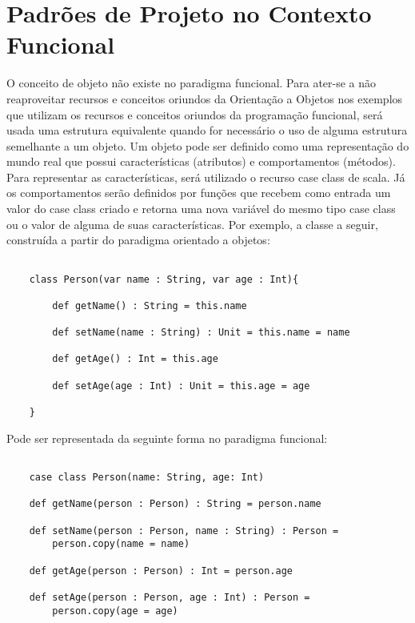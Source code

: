 
\chapter{Padrões de Projeto no Contexto Funcional}

O conceito de objeto não existe no paradigma funcional. Para ater-se a não reaproveitar recursos e conceitos oriundos da Orientação a Objetos nos exemplos que utilizam os recursos e conceitos oriundos da programação funcional, será usada uma estrutura equivalente quando for necessário o uso de alguma estrutura semelhante a um objeto.
Um objeto pode ser definido como uma representação do mundo real que possui características (atributos) e comportamentos (métodos). Para representar as características, será utilizado o recurso case class de scala. Já os comportamentos serão definidos por funções que recebem como entrada um valor do case class criado e retorna uma nova variável do mesmo tipo case class ou o valor de alguma de suas características. Por exemplo, a classe a seguir, construída a partir do paradigma orientado a objetos:



\begin{lstlisting}[caption={Classe comum em Orientação a Objetos},label=ooclass]
    
    class Person(var name : String, var age : Int){

        def getName() : String = this.name

        def setName(name : String) : Unit = this.name = name

        def getAge() : Int = this.age

        def setAge(age : Int) : Unit = this.age = age

    }   

\end{lstlisting}



Pode ser representada da seguinte forma no paradigma funcional:

\begin{lstlisting}[caption={Representação de uma classe no contexto funcional},label=pfclass]
    
    case class Person(name: String, age: Int)

    def getName(person : Person) : String = person.name

    def setName(person : Person, name : String) : Person = 
        person.copy(name = name)

    def getAge(person : Person) : Int = person.age

    def setAge(person : Person, age : Int) : Person =
        person.copy(age = age)

\end{lstlisting}